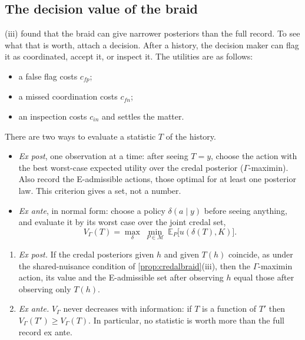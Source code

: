 \documentclass[11pt]{article}
\theoremstyle{definition}\newtheorem{definition}[theorem]{Definition}\newtheorem{remark}[theorem]{Remark}\newtheorem{example}[theorem]{Example}\newtheorem{problem}[theorem]{Open problem}\crefname{problem}{Problem}{Problems}
\begin{document}
\subsection{The decision value of the braid}\label{sec:braidvalue}
(iii) found that the braid can give narrower posteriors than the full record. To see what that is worth, attach a decision. After a history, the decision maker can flag it as coordinated, accept it, or inspect it. The utilities are as follows:
\begin{itemize}
\item a false flag costs $c_{fp}$;
\item a missed coordination costs $c_{fn}$;
\item an inspection costs $c_{in}$ and settles the matter.
\end{itemize}
There are two ways to evaluate a statistic $T$ of the history.
\begin{itemize}
\item \emph{Ex post}, one observation at a time: after seeing $T=y$, choose the action with the best worst-case expected utility over the credal posterior ($\Gamma$-maximin). Also record the E-admissible actions, those optimal for at least one posterior law. This criterion gives a set, not a number.
\item \emph{Ex ante}, in normal form: choose a policy $\delta(a\mid y)$ before seeing anything, and evaluate it by its worst case over the joint credal set,
\[
V_\Gamma(T)=\max_\delta\ \min_{P\in\mathcal M}\ \mathbb E_P\big[u(\delta(T),K)\big].
\]
\end{itemize}

\begin{proposition}\label{prop:braidvalue}
\begin{enumerate}
\item[(i)] \emph{Ex post.} If the credal posteriors given $h$ and given $T(h)$ coincide, as under the shared-nuisance condition of \cref{prop:credalbraid}(iii), then the $\Gamma$-maximin action, its value and the E-admissible set after observing $h$ equal those after observing only $T(h)$.
\item[(ii)] \emph{Ex ante.} $V_\Gamma$ never decreases with information: if $T$ is a function of $T'$ then $V_\Gamma(T')\ge V_\Gamma(T)$. In particular, no statistic is worth more than the full record ex ante.
\end{enumerate}
\end{proposition}
\end{document}
